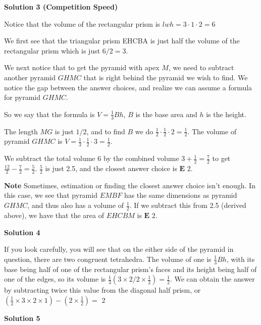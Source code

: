 \begin{enumerate}
 



\textbf{Solution 3 (Competition Speed)}

Notice that the volume of the rectangular prism is \( lwh = 3 \cdot 1 \cdot 2 = 6 \)

 We first see that the triangular prism EHCBA is just half the volume of the rectangular prism which is just \( 6/2 = 3 \).

 We next notice that to get the pyramid with apex \( M \), we need to subtract another pyramid \( GHMC \) that is right behind the pyramid we wish to find. We notice the gap between the answer choices, and realize we can assume a formula for pyramid \( GHMC \).

 So we say that the formula is \( V = \frac{1}{3} Bh \), \( B \) is the base area and \( h \) is the height.

 The length \( MG \) is just \( 1/2 \), and to find \( B \) we do \( \frac{1}{2} \cdot \frac{1}{2} \cdot 2 = \frac{1}{2} \). The volume of pyramid \( GHMC \) is \( V = \frac{1}{3} \cdot \frac{1}{2} \cdot 3 = \frac{1}{2} \).

 We subtract the total volume 6 by the combined volume \( 3 + \frac{1}{2} = \frac{7}{2} \) to get \( \frac{12}{2} - \frac{7}{2} = \frac{5}{2} \). \( \frac{5}{2} \) is just 2.5, and the closest answer choice is $\boxed{\textbf{E } 2}$.

 \textbf{Note} Sometimes, estimation or finding the closest answer choice isn't enough. In this case, we see that pyramid \( EMBF \) has the same dimensions as pyramid \( GHMC \), and thus also has a volume of $\frac{1}{2} .$ If we subtract this from 2.5 (derived above), we have that the area of  \( EHCBM \) is $\boxed{\textbf{E } 2}$.

 



\textbf{Solution 4}

If you look carefully, you will see that on the either side of the pyramid in question, there are two congruent tetrahedra. The volume of one is $\frac{1}{3}Bh$, with its base being half of one of the rectangular prism's faces and its height being half of one of the edges, so its volume is $\frac{1}{3} (3 \times 2/2 \times \frac{1}{2})=\frac{1}{2}$. We can obtain the answer by subtracting twice this value from the diagonal half prism, or$(\frac{1}{2} \times 3 \times 2 \times 1) - (2 \times \frac{1}{2})=$ $\boxed{2}$




\textbf{Solution 5}


\end{enumerate}
